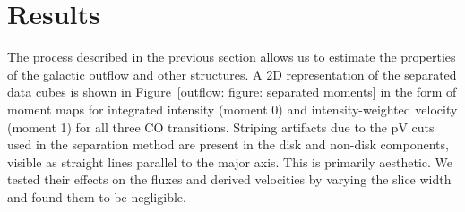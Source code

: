 
\section{Results}
\label{outflow: section: results separated disk/non-disk}

The process described in the previous section allows us to estimate the properties of the galactic outflow and other structures. 
A 2D representation of the separated data cubes is shown in Figure~\ref{outflow: figure: separated moments} in the form of moment maps for integrated intensity (moment 0) and intensity-weighted velocity (moment 1) for all three CO transitions. Striping artifacts due to the pV cuts used in the separation method are present in the disk and non-disk components, visible as straight lines parallel to the major axis. This is primarily aesthetic. We tested their effects on the fluxes and derived velocities by varying the slice width and found them to be negligible.


